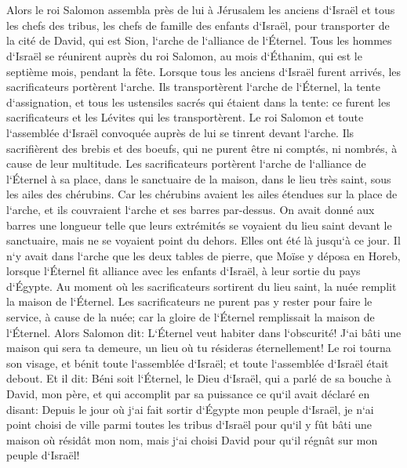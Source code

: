 \chapter{}

\verse Alors le roi Salomon assembla près de lui à Jérusalem les anciens d`Israël et tous les chefs des tribus, les chefs de famille des enfants d`Israël, pour transporter de la cité de David, qui est Sion, l`arche de l`alliance de l`Éternel. 
\verse Tous les hommes d`Israël se réunirent auprès du roi Salomon, au mois d`Éthanim, qui est le septième mois, pendant la fête. 
\verse Lorsque tous les anciens d`Israël furent arrivés, les sacrificateurs portèrent l`arche. 
\verse Ils transportèrent l`arche de l`Éternel, la tente d`assignation, et tous les ustensiles sacrés qui étaient dans la tente: ce furent les sacrificateurs et les Lévites qui les transportèrent. 
\verse Le roi Salomon et toute l`assemblée d`Israël convoquée auprès de lui se tinrent devant l`arche. Ils sacrifièrent des brebis et des boeufs, qui ne purent être ni comptés, ni nombrés, à cause de leur multitude. 
\verse Les sacrificateurs portèrent l`arche de l`alliance de l`Éternel à sa place, dans le sanctuaire de la maison, dans le lieu très saint, sous les ailes des chérubins. 
\verse Car les chérubins avaient les ailes étendues sur la place de l`arche, et ils couvraient l`arche et ses barres par-dessus. 
\verse On avait donné aux barres une longueur telle que leurs extrémités se voyaient du lieu saint devant le sanctuaire, mais ne se voyaient point du dehors. Elles ont été là jusqu`à ce jour. 
\verse Il n`y avait dans l`arche que les deux tables de pierre, que Moïse y déposa en Horeb, lorsque l`Éternel fit alliance avec les enfants d`Israël, à leur sortie du pays d`Égypte. 
\verse Au moment où les sacrificateurs sortirent du lieu saint, la nuée remplit la maison de l`Éternel. 
\verse Les sacrificateurs ne purent pas y rester pour faire le service, à cause de la nuée; car la gloire de l`Éternel remplissait la maison de l`Éternel. 
\verse Alors Salomon dit: L`Éternel veut habiter dans l`obscurité! 
\verse J`ai bâti une maison qui sera ta demeure, un lieu où tu résideras éternellement! 
\verse Le roi tourna son visage, et bénit toute l`assemblée d`Israël; et toute l`assemblée d`Israël était debout. 
\verse Et il dit: Béni soit l`Éternel, le Dieu d`Israël, qui a parlé de sa bouche à David, mon père, et qui accomplit par sa puissance ce qu`il avait déclaré en disant: 
\verse Depuis le jour où j`ai fait sortir d`Égypte mon peuple d`Israël, je n`ai point choisi de ville parmi toutes les tribus d`Israël pour qu`il y fût bâti une maison où résidât mon nom, mais j`ai choisi David pour qu`il régnât sur mon peuple d`Israël! 
